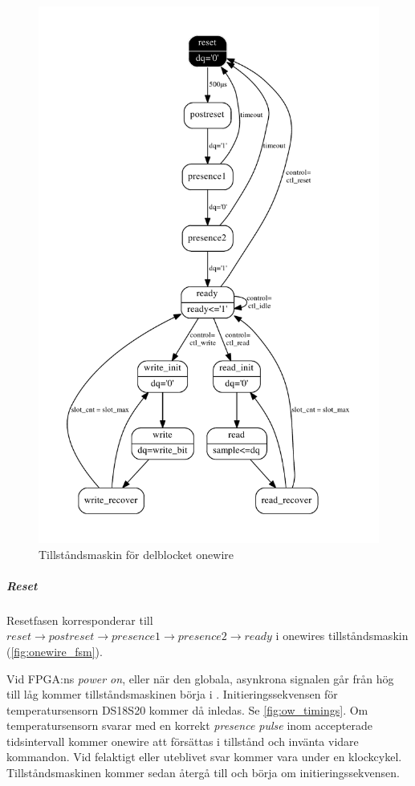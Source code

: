 \begin{figure}[H]
\centering
\includegraphics[height=0.97\textheight]{onewire_state.pdf}
\caption{Tillståndsmaskin för delblocket onewire}
\label{fig:onewire_fsm}
\end{figure}


\subparagraph{Reset}
Resetfasen korresponderar till $reset\rightarrow postreset\rightarrow presence1\rightarrow presence2\rightarrow ready$ i onewires tillståndsmaskin (\autoref{fig:onewire_fsm}).

Vid FPGA:ns \emph{power on}, eller när den globala, asynkrona  signalen går från hög till låg kommer tillståndsmaskinen börja i . Initieringssekvensen för temperatursensorn DS18S20 kommer då inledas. Se \autoref{fig:ow_timings}. Om temperatursensorn svarar med en korrekt \emph{presence pulse} inom accepterade tidsintervall kommer onewire att försättas i tillstånd  och invänta vidare kommandon. Vid felaktigt eller uteblivet svar kommer  vara \high{} under en klockcykel. Tillståndsmaskinen kommer sedan återgå till  och börja om initieringssekvensen.

